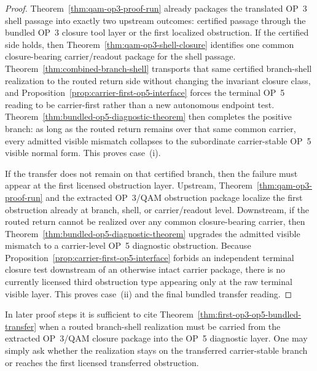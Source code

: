 \begin{proof}
Theorem~\ref{thm:qam-op3-proof-run} already packages the translated OP~3 shell passage into exactly two upstream outcomes: certified passage through the bundled OP~3 closure tool layer or the first localized obstruction. If the certified side holds, then Theorem~\ref{thm:qam-op3-shell-closure} identifies one common closure-bearing carrier/readout package for the shell passage. Theorem~\ref{thm:combined-branch-shell} transports that same certified branch-shell realization to the routed return side without changing the invariant closure class, and Proposition~\ref{prop:carrier-first-op5-interface} forces the terminal OP~5 reading to be carrier-first rather than a new autonomous endpoint test. Theorem~\ref{thm:bundled-op5-diagnostic-theorem} then completes the positive branch: as long as the routed return remains over that same common carrier, every admitted visible mismatch collapses to the subordinate carrier-stable OP~5 visible normal form. This proves case~(i).

If the transfer does not remain on that certified branch, then the failure must appear at the first licensed obstruction layer. Upstream, Theorem~\ref{thm:qam-op3-proof-run} and the extracted OP~3/QAM obstruction package localize the first obstruction already at branch, shell, or carrier/readout level. Downstream, if the routed return cannot be realized over any common closure-bearing carrier, then Theorem~\ref{thm:bundled-op5-diagnostic-theorem} upgrades the admitted visible mismatch to a carrier-level OP~5 diagnostic obstruction. Because Proposition~\ref{prop:carrier-first-op5-interface} forbids an independent terminal closure test downstream of an otherwise intact carrier package, there is no currently licensed third obstruction type appearing only at the raw terminal visible layer. This proves case~(ii) and the final bundled transfer reading.
\end{proof}

\begin{corollary}
\label{cor:bundled-op3-op5-proof-use-rule}
In later proof steps it is sufficient to cite Theorem~\ref{thm:first-op3-op5-bundled-transfer} when a routed branch-shell realization must be carried from the extracted OP~3/QAM closure package into the OP~5 diagnostic layer. One may simply ask whether the realization stays on the transferred carrier-stable branch or reaches the first licensed transferred obstruction.
\end{corollary}

